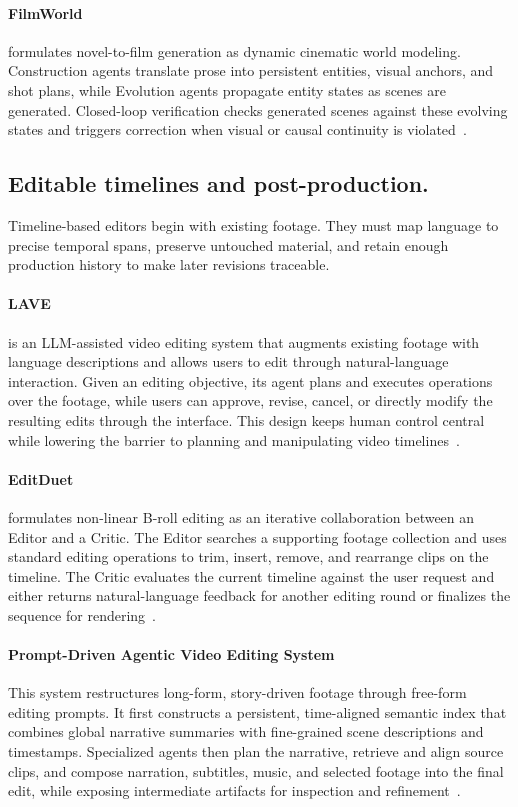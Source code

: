 \paragraph{FilmWorld}
 formulates novel-to-film generation as dynamic cinematic world modeling. Construction agents translate prose into persistent entities, visual anchors, and shot plans, while Evolution agents propagate entity states as scenes are generated. Closed-loop verification checks generated scenes against these evolving states and triggers correction when visual or causal continuity is violated~\cite{avg260719038}.

\subsection{Editable timelines and post-production.}
Timeline-based editors begin with existing footage. They must map language to precise temporal spans, preserve untouched material, and retain enough production history to make later revisions traceable.

\paragraph{LAVE}
 is an LLM-assisted video editing system that augments existing footage with language descriptions and allows users to edit through natural-language interaction. Given an editing objective, its agent plans and executes operations over the footage, while users can approve, revise, cancel, or directly modify the resulting edits through the interface. This design keeps human control central while lowering the barrier to planning and manipulating video timelines~\cite{wang2024lave}.

\paragraph{EditDuet}
 formulates non-linear B-roll editing as an iterative collaboration between an Editor and a Critic. The Editor searches a supporting footage collection and uses standard editing operations to trim, insert, remove, and rearrange clips on the timeline. The Critic evaluates the current timeline against the user request and either returns natural-language feedback for another editing round or finalizes the sequence for rendering~\cite{avg250910761}.

\paragraph{Prompt-Driven Agentic Video Editing System}
This system restructures long-form, story-driven footage through free-form editing prompts. It first constructs a persistent, time-aligned semantic index that combines global narrative summaries with fine-grained scene descriptions and timestamps. Specialized agents then plan the narrative, retrieve and align source clips, and compose narration, subtitles, music, and selected footage into the final edit, while exposing intermediate artifacts for inspection and refinement~\cite{avg250916811}.

